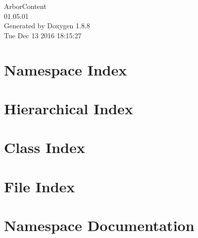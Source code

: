 \documentclass[twoside]{book}
\newcommand{\+}{\discretionary{\mbox{\scriptsize$\hookleftarrow$}}{}{}}
\newcommand{\clearemptydoublepage}{%
  \newpage{\pagestyle{empty}\cleardoublepage}%
}
\begin{document}
\begin{titlepage}
\vspace*{7cm}
\begin{center}%
{\Large Arbor\+Content \\[1ex]\large 01.\+05.\+01 }\\
\vspace*{1cm}
{\large Generated by Doxygen 1.8.8}\\
\vspace*{0.5cm}
{\small Tue Dec 13 2016 18:15:27}\\
\end{center}
\end{titlepage}
\clearemptydoublepage
\tableofcontents
\clearemptydoublepage
{}

\chapter{Namespace Index}

\chapter{Hierarchical Index}

\chapter{Class Index}

\chapter{File Index}

\chapter{Namespace Documentation}


\end{document}
